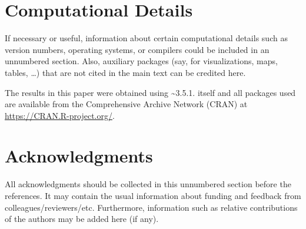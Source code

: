 \documentclass[
]{jdssv}
\begin{document}
\newpage

\hypertarget{computational-details}{%
\section*{Computational Details}\label{computational-details}}

If necessary or useful, information about certain computational details
such as version numbers, operating systems, or compilers could be
included in an unnumbered section. Also, auxiliary packages (say, for
visualizations, maps, tables, \dots) that are not cited in the main text
can be credited here.

The results in this paper were obtained using
\textasciitilde3.5.1.  itself and all packages
used are available from the Comprehensive  Archive Network
(CRAN) at \url{https://CRAN.R-project.org/}.

\hypertarget{acknowledgments}{%
\section*{Acknowledgments}\label{acknowledgments}}

All acknowledgments should be collected in this unnumbered section
before the references. It may contain the usual information about
funding and feedback from colleagues/reviewers/etc. Furthermore,
information such as relative contributions of the authors may be added
here (if any).



\newpage

\setcounter{section}{0}
\renewcommand{\thesection}{\Alph{section}}
\end{document}
